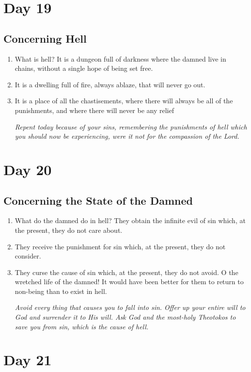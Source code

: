 \documentclass[11pt]{article}
\begin{document}
\section{Day 19}
\label{sec:org6b837aa}
\subsection{Concerning Hell}
\label{sec:org03d81ea}
\begin{enumerate}
\item What is hell? It is a dungeon full of darkness where the damned live in chains, without a single hope of being set free.
\item It is a dwelling full of fire, always ablaze, that will never go out.
\item It is a place of all the chastisements, where there will always be all of the punishments, and where there will never be any relief

\emph{Repent today because of your sins, remembering the punishments of hell which you should now be experiencing, were it not for the compassion of the Lord.}
\end{enumerate}
\section{Day 20}
\label{sec:org47a50a9}
\subsection{Concerning the State of the Damned}
\label{sec:org4d16b59}
\begin{enumerate}
\item What do the damned do in hell? They obtain the infinite evil of sin which, at the present, they do not care about.
\item They receive the punishment for sin which, at the present, they do not consider.
\item They curse the cause of sin which, at the present, they do not avoid. O the wretched life of the damned! It would have been better for
them to return to non-being than to exist in hell.

\emph{Avoid every thing that causes you to fall into sin. Offer up your entire will to God and surrender it to His will. Ask God and the most-holy Theotokos to}
\emph{save you from sin, which is the cause of hell.}
\end{enumerate}
\section{Day 21}
\label{sec:org4740ce5}
\end{document}
